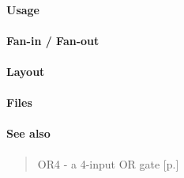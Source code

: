 \paragraph{Usage}

\paragraph{Fan-in / Fan-out}

\paragraph{Layout}

\paragraph{Files}

\paragraph{See also}
\begin{quote}
    OR4 - a 4-input OR gate [p.\pageref{AO2111}]
\end{quote}
